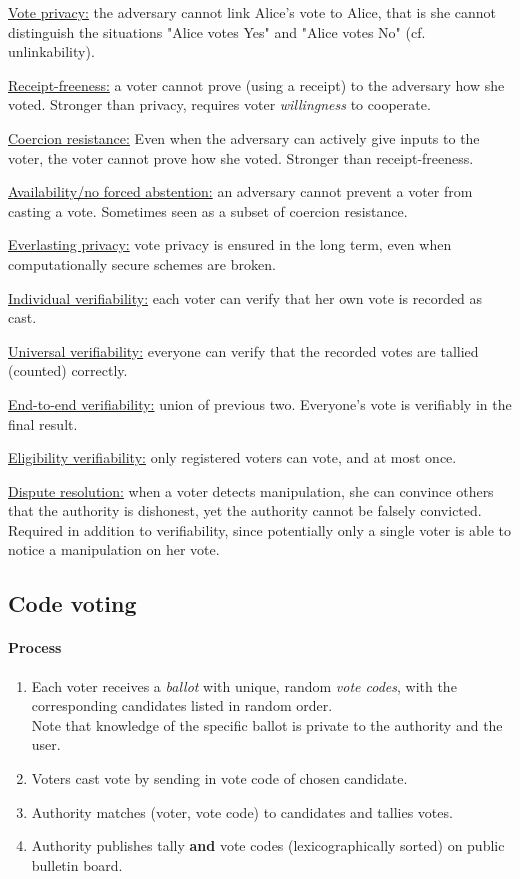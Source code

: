 \underline{Vote privacy:} the adversary cannot link Alice's vote to Alice, that is she cannot distinguish the situations "Alice votes Yes" and "Alice votes No" (cf. unlinkability).

\underline{Receipt-freeness:} a voter cannot prove (using a receipt) to the adversary how she voted. Stronger than privacy, requires voter \emph{willingness} to cooperate.

\underline{Coercion resistance:} Even when the adversary can actively give inputs to the voter, the voter  cannot prove how she voted. Stronger than receipt-freeness.

\underline{Availability/no forced abstention:} an adversary cannot prevent a voter from casting a vote. Sometimes seen as a subset of coercion resistance.

\underline{Everlasting privacy:} vote privacy is ensured in the long term, even when computationally secure schemes are broken.

\underline{Individual verifiability:} each voter can verify that her own vote is recorded as cast.

\underline{Universal verifiability:} everyone can verify that the recorded votes are tallied (counted) correctly.

\underline{End-to-end verifiability:} union of previous two. Everyone's vote is verifiably in the final result.

\underline{Eligibility verifiability:} only registered voters can vote, and at most once.

\underline{Dispute resolution:} when a voter detects manipulation, she can convince others that the authority is dishonest, yet the authority cannot be falsely convicted. Required in addition to verifiability, since potentially only a single voter is able to notice a manipulation on her vote.


\subsection{Code voting}

\paragraph{Process}
\begin{enumerate}
    \item Each voter receives a \emph{ballot} with unique, random \emph{vote codes}, with the corresponding candidates listed in random order.\\
    Note that knowledge of the specific ballot is private to the authority and the user.
    \item Voters cast vote by sending in vote code of chosen candidate.
    \item Authority matches (voter, vote code) to candidates and tallies votes.
    \item Authority publishes tally \textbf{and} vote codes (lexicographically sorted) on public bulletin board.
\end{enumerate}

